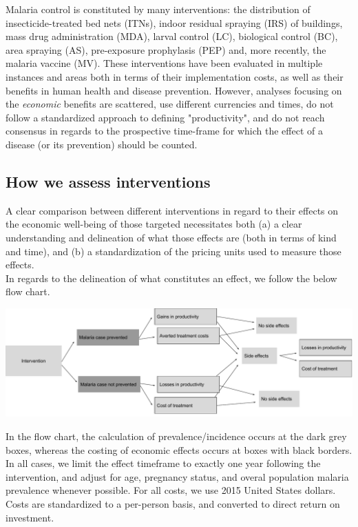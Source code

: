 \documentclass{article}
\begin{document}
Malaria control is constituted by many interventions: the distribution of insecticide-treated bed nets (ITNs), indoor residual spraying (IRS) of buildings, mass drug administration (MDA), larval control (LC), biological control (BC), area spraying (AS), pre-exposure prophylasis (PEP) and, more recently, the malaria vaccine (MV). These interventions have been evaluated in multiple instances and areas both in terms of their implementation costs, as well as their benefits in human health and disease prevention. However, analyses focusing on the \emph{economic} benefits are scattered, use different currencies and times, do not follow a standardized approach to defining "productivity", and do not reach consensus in regards to the prospective time-frame for which the effect of a disease (or its prevention) should be counted.\\  

\subsection*{How we assess interventions}

A clear comparison between different interventions in regard to their effects on the economic well-being of those targeted necessitates both (a) a clear understanding and delineation of what those effects are (both in terms of kind and time), and (b) a standardization of the pricing units used to measure those effects. \\ 

\noindent In regards to the delineation of what constitutes an effect, we follow the below flow chart.

\begin{center}
\includegraphics[width=1\textwidth]{logic_flow.pdf}
\end{center}

\noindent In the flow chart, the calculation of prevalence/incidence occurs at the dark grey boxes, whereas the costing of economic effects occurs at boxes with black borders. In all cases, we limit the effect timeframe to exactly one year following the intervention, and adjust for age, pregnancy status, and overal population malaria prevalence whenever possible. For all costs, we use 2015 United States dollars. Costs are standardized to a per-person basis, and converted to direct return on investment. \\
\end{document}
